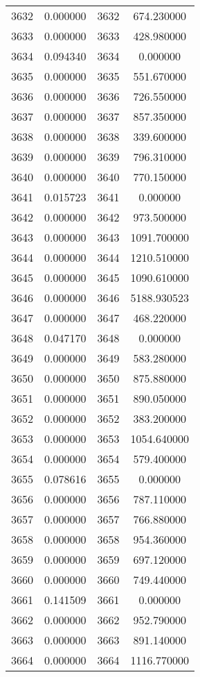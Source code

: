 \documentclass[12pt]{article}
\begin{document}
\begin{longtable}{@{}cccc@{}}
3632 & 0.000000 & 3632 & 674.230000 \\
3633 & 0.000000 & 3633 & 428.980000 \\
3634 & 0.094340 & 3634 & 0.000000 \\
3635 & 0.000000 & 3635 & 551.670000 \\
3636 & 0.000000 & 3636 & 726.550000 \\
3637 & 0.000000 & 3637 & 857.350000 \\
3638 & 0.000000 & 3638 & 339.600000 \\
3639 & 0.000000 & 3639 & 796.310000 \\
3640 & 0.000000 & 3640 & 770.150000 \\
3641 & 0.015723 & 3641 & 0.000000 \\
3642 & 0.000000 & 3642 & 973.500000 \\
3643 & 0.000000 & 3643 & 1091.700000 \\
3644 & 0.000000 & 3644 & 1210.510000 \\
3645 & 0.000000 & 3645 & 1090.610000 \\
3646 & 0.000000 & 3646 & 5188.930523 \\
3647 & 0.000000 & 3647 & 468.220000 \\
3648 & 0.047170 & 3648 & 0.000000 \\
3649 & 0.000000 & 3649 & 583.280000 \\
3650 & 0.000000 & 3650 & 875.880000 \\
3651 & 0.000000 & 3651 & 890.050000 \\
3652 & 0.000000 & 3652 & 383.200000 \\
3653 & 0.000000 & 3653 & 1054.640000 \\
3654 & 0.000000 & 3654 & 579.400000 \\
3655 & 0.078616 & 3655 & 0.000000 \\
3656 & 0.000000 & 3656 & 787.110000 \\
3657 & 0.000000 & 3657 & 766.880000 \\
3658 & 0.000000 & 3658 & 954.360000 \\
3659 & 0.000000 & 3659 & 697.120000 \\
3660 & 0.000000 & 3660 & 749.440000 \\
3661 & 0.141509 & 3661 & 0.000000 \\
3662 & 0.000000 & 3662 & 952.790000 \\
3663 & 0.000000 & 3663 & 891.140000 \\
3664 & 0.000000 & 3664 & 1116.770000 \\

\end{longtable}
\end{document}
